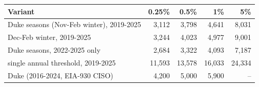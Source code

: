 \begin{tabular}{lrrrr}
\toprule
Variant & 0.25\% & 0.5\% & 1\% & 5\% \\
\midrule
Duke seasons (Nov-Feb winter), 2019-2025 & 3,112 & 3,798 & 4,641 & 8,031 \\
Dec-Feb winter, 2019-2025 & 3,244 & 4,023 & 4,977 & 9,001 \\
Duke seasons, 2022-2025 only & 2,684 & 3,322 & 4,093 & 7,187 \\
single annual threshold, 2019-2025 & 11,593 & 13,578 & 16,033 & 24,334 \\
Duke (2016-2024, EIA-930 CISO) & 4,200 & 5,000 & 5,900 & -- \\
\bottomrule
\end{tabular}